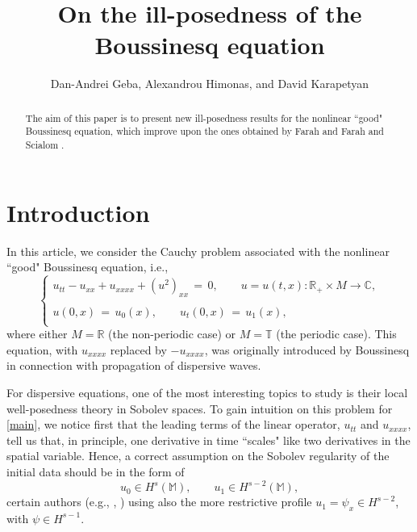 \documentclass{amsart}
\begin{document}
\title{On the ill-posedness of the Boussinesq equation}

\author{Dan-Andrei Geba, Alexandrou Himonas, and David Karapetyan}

\address{Department of Mathematics, University of Rochester, Rochester, NY 14627}
\address{Department of Mathematics, University of Notre Dame, Notre Dame, IN 46556}
\address{Department of Mathematics, University of Notre Dame, Notre Dame, IN 46556}
\date{}

\begin{abstract}
The aim of this paper is to present new ill-posedness results for the nonlinear ``good" Boussinesq equation, which improve upon the ones obtained by Farah \cite{F09} and Farah and Scialom \cite{FS10}.
\end{abstract}


\maketitle

\section{Introduction}

In this article, we consider the Cauchy problem associated with the  nonlinear ``good" Boussinesq equation, i.e.,
\begin{equation}
\left\{
\begin{array}{l}
u_{tt}-u_{xx}+u_{xxxx}+(u^2)_{xx}\,=\,0, \qquad u=u(t,x): \mathbb{R}_+\times M \to \mathbb{C},\\
\\
u(0,x)\,=\,u_0(x),\qquad u_t(0,x)\,=\,u_1(x),\\
\end{array}\right.
\label{main}
\end{equation}
where either $M=\mathbb{R}$ (the non-periodic case) or $M=\mathbb{T}$ (the periodic case). This equation, with $u_{xxxx}$ replaced by $-u_{xxxx}$, was originally introduced by Boussinesq \cite{B72} in connection with propagation of dispersive waves.

For dispersive equations, one of the most interesting topics to study is their local well-posedness theory in Sobolev spaces. To gain intuition on this problem for  \eqref{main}, we notice first that the leading terms of the linear operator, $u_{tt}$ and $u_{xxxx}$, tell us that, in principle, one derivative in time ``scales" like two derivatives in the spatial variable. Hence, a correct assumption on the Sobolev regularity of the 
initial data should be in the form of  
\begin{equation}
u_0 \in H^s(\mathbb{M}), \qquad u_1 \in H^{s-2}(\mathbb{M}),
\label{not}
\end{equation}
certain authors (e.g., \cite{F09}, \cite{FS10}) using also the more restrictive profile $u_1=\psi_x \in H^{s-2}$, with $\psi \in H^{s-1}$.
\end{document}
